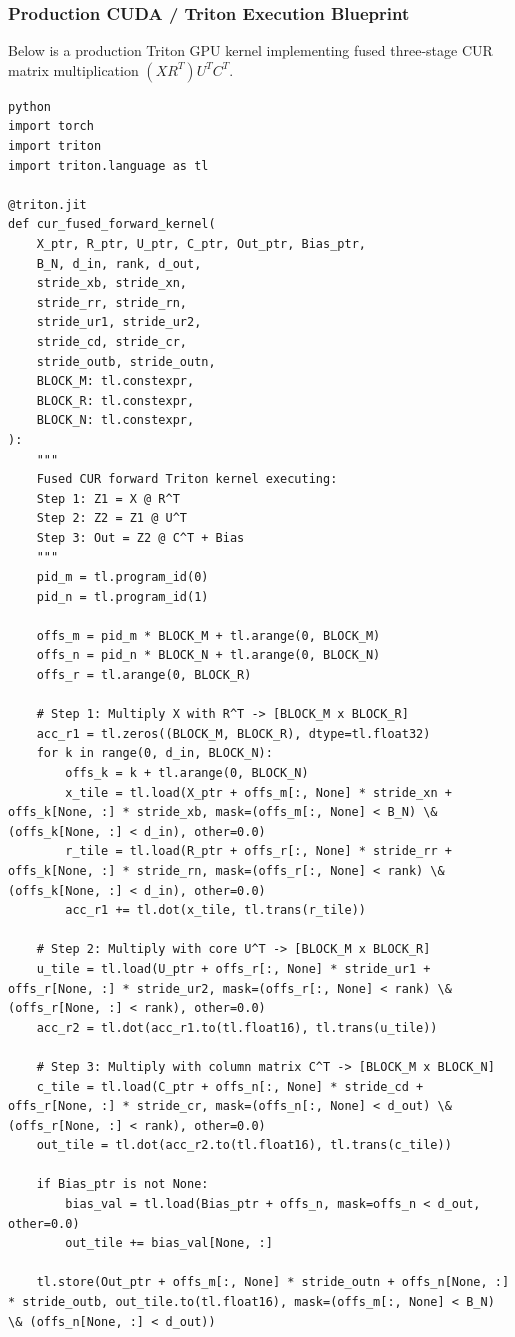 \subsubsection*{Production CUDA / Triton Execution Blueprint}

Below is a production Triton GPU kernel implementing fused three-stage CUR matrix multiplication $(X R^T) U^T C^T$.

\vspace{0.5em}
\begin{mdframed}[backgroundcolor=codebg, linecolor=codeframe, linewidth=1pt, roundcorner=4pt, innerleftmargin=2pt, innerrightmargin=5pt, innertopmargin=5pt, innerbottommargin=5pt]
\begin{lstlisting}
python
import torch
import triton
import triton.language as tl

@triton.jit
def cur_fused_forward_kernel(
    X_ptr, R_ptr, U_ptr, C_ptr, Out_ptr, Bias_ptr,
    B_N, d_in, rank, d_out,
    stride_xb, stride_xn,
    stride_rr, stride_rn,
    stride_ur1, stride_ur2,
    stride_cd, stride_cr,
    stride_outb, stride_outn,
    BLOCK_M: tl.constexpr,
    BLOCK_R: tl.constexpr,
    BLOCK_N: tl.constexpr,
):
    """
    Fused CUR forward Triton kernel executing:
    Step 1: Z1 = X @ R^T
    Step 2: Z2 = Z1 @ U^T
    Step 3: Out = Z2 @ C^T + Bias
    """
    pid_m = tl.program_id(0)
    pid_n = tl.program_id(1)

    offs_m = pid_m * BLOCK_M + tl.arange(0, BLOCK_M)
    offs_n = pid_n * BLOCK_N + tl.arange(0, BLOCK_N)
    offs_r = tl.arange(0, BLOCK_R)

    # Step 1: Multiply X with R^T -> [BLOCK_M x BLOCK_R]
    acc_r1 = tl.zeros((BLOCK_M, BLOCK_R), dtype=tl.float32)
    for k in range(0, d_in, BLOCK_N):
        offs_k = k + tl.arange(0, BLOCK_N)
        x_tile = tl.load(X_ptr + offs_m[:, None] * stride_xn + offs_k[None, :] * stride_xb, mask=(offs_m[:, None] < B_N) \& (offs_k[None, :] < d_in), other=0.0)
        r_tile = tl.load(R_ptr + offs_r[:, None] * stride_rr + offs_k[None, :] * stride_rn, mask=(offs_r[:, None] < rank) \& (offs_k[None, :] < d_in), other=0.0)
        acc_r1 += tl.dot(x_tile, tl.trans(r_tile))

    # Step 2: Multiply with core U^T -> [BLOCK_M x BLOCK_R]
    u_tile = tl.load(U_ptr + offs_r[:, None] * stride_ur1 + offs_r[None, :] * stride_ur2, mask=(offs_r[:, None] < rank) \& (offs_r[None, :] < rank), other=0.0)
    acc_r2 = tl.dot(acc_r1.to(tl.float16), tl.trans(u_tile))

    # Step 3: Multiply with column matrix C^T -> [BLOCK_M x BLOCK_N]
    c_tile = tl.load(C_ptr + offs_n[:, None] * stride_cd + offs_r[None, :] * stride_cr, mask=(offs_n[:, None] < d_out) \& (offs_r[None, :] < rank), other=0.0)
    out_tile = tl.dot(acc_r2.to(tl.float16), tl.trans(c_tile))

    if Bias_ptr is not None:
        bias_val = tl.load(Bias_ptr + offs_n, mask=offs_n < d_out, other=0.0)
        out_tile += bias_val[None, :]

    tl.store(Out_ptr + offs_m[:, None] * stride_outn + offs_n[None, :] * stride_outb, out_tile.to(tl.float16), mask=(offs_m[:, None] < B_N) \& (offs_n[None, :] < d_out))
\end{lstlisting}
\end{mdframed}
